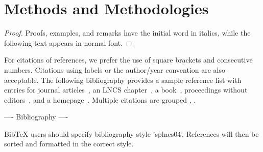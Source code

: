 \documentclass[runningheads]{llncs}
\begin{document}
\newpage
\section{Methods and Methodologies}

\begin{proof}
Proofs, examples, and remarks have the initial word in italics,
while the following text appears in normal font.
\end{proof}
For citations of references, we prefer the use of square brackets
and consecutive numbers. Citations using labels or the author/year
convention are also acceptable. The following bibliography provides
a sample reference list with entries for journal
articles~\cite{smither2005relationship}, an LNCS chapter~\cite{ref_lncs1}, a
book~\cite{ref_book1}, proceedings without editors~\cite{ref_proc1},
and a homepage~\cite{ref_url1}. Multiple citations are grouped
\cite{ref_article1,ref_lncs1,ref_book1},
\cite{ref_article1,ref_book1,ref_proc1,ref_url1}.

---- Bibliography ----

BibTeX users should specify bibliography style 'splncs04'.
References will then be sorted and formatted in the correct style.

% 
% 









\end{document}
